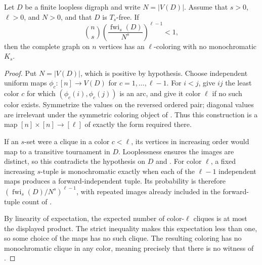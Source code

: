 \begin{lemma}
Let $D$ be a finite loopless digraph and write $N=|V(D)|$.  Assume that
$s>0$, $\ell>0$, and $N>0$, and that $D$ is $T_s$-free.  If
\[
 \binom ns\left(\frac{\operatorname{fwi}_s(D)}{N^s}\right)^{\ell-1}<1,
\]
then the complete graph on $n$ vertices has an $\ell$-coloring with no
monochromatic $K_s$.
\end{lemma}
\begin{proof}
Put $N=|V(D)|$, which is positive by hypothesis.  Choose independent
uniform maps $\phi_c:[n]\to V(D)$ for
$c=1,\ldots,\ell-1$.  For $i<j$, give $ij$ the least color $c$ for which
$(\phi_c(i),\phi_c(j))$ is an arc, and give it color $\ell$ if no such color
exists.  Symmetrize the values on the reversed ordered pair; diagonal values
are irrelevant under the symmetric coloring object of
.  Thus this construction is a map
$[n]\times[n]\to[\ell]$ of exactly the form required there.

If an $s$-set were a clique in a color $c<\ell$, its vertices in increasing
order would map to a transitive tournament in $D$.  Looplessness ensures the
images are distinct, so this contradicts the hypothesis on $D$ and
.  For color $\ell$, a fixed increasing
$s$-tuple is monochromatic exactly when each of the $\ell-1$ independent maps
produces a forward-independent tuple.  Its probability is therefore
$(\operatorname{fwi}_s(D)/N^s)^{\ell-1}$, with repeated images already
included in the forward-tuple count of .

By linearity of expectation, the expected number of color-$\ell$ cliques is
at most the displayed product.  The strict inequality makes this expectation
less than one, so some choice of the maps has no such clique.  The resulting
coloring has no monochromatic clique in any color, meaning precisely that
there is no witness of .
\end{proof}
